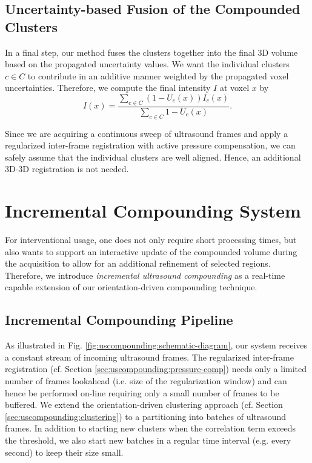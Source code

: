\subsection{Uncertainty-based Fusion of the Compounded Clusters}
In a final step, our method fuses the clusters together into the final 3D volume based on the propagated uncertainty values.
We want the individual clusters $c \in C$ to contribute in an additive manner weighted by the propagated voxel uncertainties.
Therefore, we compute the final intensity $I$ at voxel $x$ by
\begin{equation}
	\label{eq:uscompounding:fusion}
	I(x)		=		\frac{\sum_{c\in C} (1 - U_c(x)) I_c(x)}{\sum_{c \in C} 1 - U_c(x)}.
\end{equation}

Since we are acquiring a continuous sweep of ultrasound frames and apply a regularized inter-frame registration with active pressure compensation, we can safely assume that the individual clusters are well aligned.
Hence, an additional 3D-3D registration is not needed.


\section{Incremental Compounding System}
For interventional usage, one does not only require short processing times, but also wants to support an interactive update of the compounded volume during the acquisition to allow for an additional refinement of selected regions.
Therefore, we introduce \emph{incremental ultrasound compounding} as a real-time capable extension of our orientation-driven compounding technique.

\subsection{Incremental Compounding Pipeline}
As illustrated in Fig. \ref{fig:uscompounding:schematic-diagram}, our system receives a constant stream of incoming ultrasound frames.
The regularized inter-frame registration (cf. Section \ref{sec:uscompounding:pressure-comp}) needs only a limited number of frames lookahead (i.e. size of the regularization window) and can hence be performed on-line requiring only a small number of frames to be buffered.
We extend the orientation-driven clustering approach (cf. Section \ref{sec:uscompounding:clustering}) to a partitioning into batches of ultrasound frames.
In addition to starting new clusters when the correlation term exceeds the threshold, we also start new batches in a regular time interval (e.g. every second) to keep their size small.


